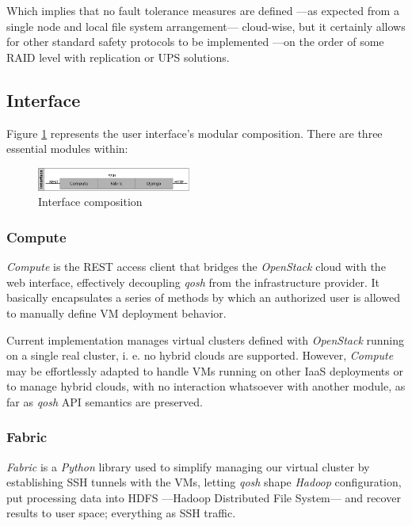 \documentclass{sig-alternate}
\begin{document}
Which implies that no fault tolerance measures are defined ---as expected from a single node and local file system arrangement--- cloud-wise, but it certainly allows for other standard safety protocols to be implemented ---on the order of some RAID level with replication or UPS solutions.


\subsection{Interface}
\noindent Figure \ref{fig:interface} represents the user interface's modular composition. There are three essential modules within:

\begin{figure}[tbp]
\centering
\includegraphics[width=0.45\textwidth]{img/003}
\caption{Interface composition}
\label{fig:interface}
\end{figure}


\subsubsection{Compute}
\noindent \emph{Compute} is the REST access client that bridges the \emph{OpenStack} cloud with the web interface, effectively decoupling \emph{qosh} from the infrastructure provider. It basically encapsulates a series of methods by which an authorized user is allowed to manually define VM deployment behavior.

Current implementation manages virtual clusters defined with \emph{OpenStack} running on a single real cluster, i. e. no hybrid clouds are supported. However, \emph{Compute} may be effortlessly adapted to handle VMs running on other IaaS deployments or to manage hybrid clouds, with no interaction whatsoever with another module, as far as \emph{qosh} API semantics are preserved.


\subsubsection{Fabric}
\noindent \emph{Fabric} is a \emph{Python} library used to simplify managing our virtual cluster by establishing SSH tunnels with the VMs, letting \emph{qosh} shape \emph{Hadoop} configuration, put processing data into HDFS ---Hadoop Distributed File System--- and recover results to user space; everything as SSH traffic.
\end{document}
